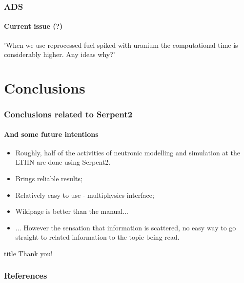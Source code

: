 \documentclass[svgnames,smaller,table]{beamer}
\begin{document}
\begin{frame}
  \frametitle{ADS}
  \framesubtitle{Current issue (?)}
  'When we use reprocessed fuel spiked with uranium the computational time is considerably higher. Any ideas why?'
\end{frame}


\section{Conclusions}
\begin{frame}
  \frametitle{Conclusions related to Serpent2}
  \framesubtitle{And some future intentions}
  \begin{itemize}
  \item Roughly, half of the activities of neutronic modelling and simulation at the LTHN are done using Serpent2.
  \item Brings reliable results;
  \item Relatively easy to use - multiphysics interface;
  \item Wikipage is better than the manual...
  \item ... However the sensation that information is scattered, no easy way to go straight to related information to the topic being read.
  \end{itemize}
\end{frame}



\begin{frame}
 \vfill
  \begin{beamercolorbox}[center]{title}
     \Huge{Thank you!}
  \end{beamercolorbox}
  \vfill
\end{frame}

\begin{frame}
    \frametitle{References}
    
    
\end{frame}
\end{document}
